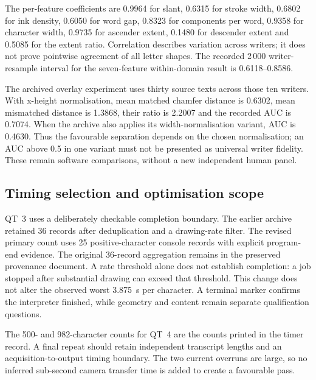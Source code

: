 The per-feature coefficients are 0.9964 for slant, 0.6315 for stroke width, 0.6802 for ink density, 0.6050 for word gap, 0.8323 for components per word, 0.9358 for character width, 0.9735 for ascender extent, 0.1480 for descender extent and 0.5085 for the extent ratio. Correlation describes variation across writers; it does not prove pointwise agreement of all letter shapes. The recorded 2\,000 writer-resample interval for the seven-feature within-domain result is 0.6118--0.8586.

The archived overlay experiment uses thirty source texts across those ten writers. With x-height normalisation, mean matched chamfer distance is 0.6302, mean mismatched distance is 1.3868, their ratio is 2.2007 and the recorded AUC is 0.7074. When the archive also applies its width-normalisation variant, AUC is 0.4630. Thus the favourable separation depends on the chosen normalisation; an AUC above 0.5 in one variant must not be presented as universal writer fidelity. These remain software comparisons, without a new independent human panel.

\subsection{Timing selection and optimisation scope}
\label{app:res-speed}
QT~3 uses a deliberately checkable completion boundary. The earlier archive retained 36 records after deduplication and a drawing-rate filter. The revised primary count uses 25 positive-character console records with explicit program-end evidence. The original 36-record aggregation remains in the preserved provenance document. A rate threshold alone does not establish completion: a job stopped after substantial drawing can exceed that threshold. This change does not alter the observed worst 3.875~s per character. A terminal marker confirms the interpreter finished, while geometry and content remain separate qualification questions.

The 500- and 982-character counts for QT~4 are the counts printed in the timer record. A final repeat should retain independent transcript lengths and an acquisition-to-output timing boundary. The two current overruns are large, so no inferred sub-second camera transfer time is added to create a favourable pass.

